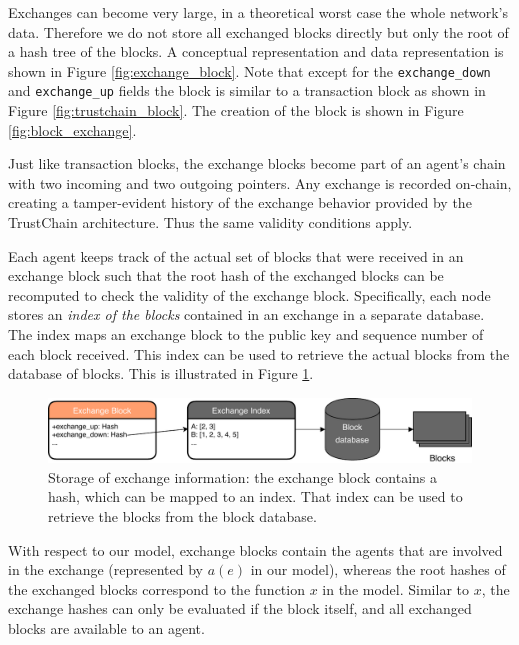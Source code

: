 Exchanges can become very large, in a theoretical 
worst case the whole network's data. Therefore we do not store all exchanged blocks directly but only
the root of a hash tree of the blocks. A conceptual representation and data representation 
is shown in Figure \ref{fig:exchange_block}. Note that except for the \verb|exchange_down| and \verb|exchange_up|
fields the block is similar to a transaction block as shown in Figure \ref{fig:trustchain_block}. 
The creation of the block is shown in Figure \ref{fig:block_exchange}.

Just like transaction blocks, the exchange blocks become part of an agent's chain with two incoming
and two outgoing pointers. Any exchange is recorded on-chain, creating a tamper-evident history 
of the exchange behavior provided by the TrustChain architecture.
Thus the same validity conditions apply. 


Each agent keeps track of the actual set of blocks that were received in an exchange block such that 
the root hash of the exchanged blocks can be recomputed to check the validity of the exchange block. Specifically, each 
node stores an \textit{index of the blocks} contained in an exchange in a separate database. The 
index maps an exchange block to the public key and sequence number of each
block received. This index can be 
used to retrieve the actual blocks from the database of blocks. This is illustrated in Figure \ref{fig:exchange_process}.

\begin{figure}
    \centering
    \includegraphics[width=\textwidth]{images/exchange_block_retrieval.pdf}
    \caption{Storage of exchange information: the exchange block contains a hash, which can be mapped to an index. That index can be used to retrieve the blocks from the block database.}
    \label{fig:exchange_process}
\end{figure}

With respect to our model, exchange blocks contain the agents that are involved in the exchange 
(represented by $a(e)$ in our model), whereas the root hashes of the exchanged blocks correspond to
the function $x$ in the model. Similar to $x$, the exchange hashes can only be evaluated if the 
block itself, and all exchanged blocks are available to an agent.

